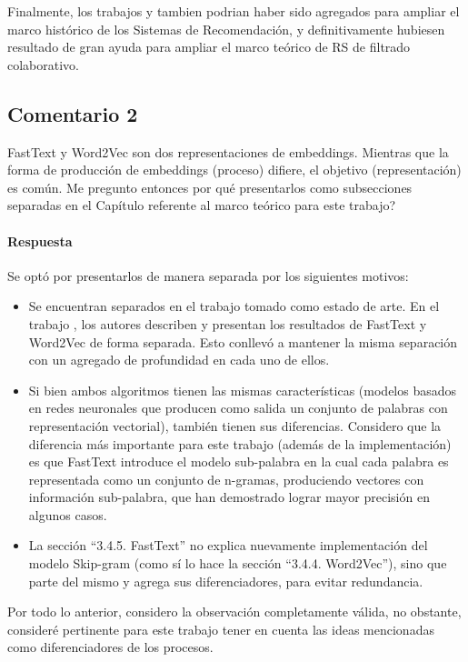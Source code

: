 \bigskip

Finalmente, los trabajos \citep{hill1995recommending} y \citep{resnick1994grouplens} tambien podrian haber sido agregados para ampliar el marco histórico de los Sistemas de Recomendación, y definitivamente hubiesen resultado de gran ayuda para ampliar el marco teórico de RS de filtrado colaborativo.

\subsection*{Comentario 2}
FastText y Word2Vec son dos representaciones de embeddings. Mientras que la forma de producción de embeddings (proceso) difiere, el objetivo (representación) es común. Me pregunto entonces por qué presentarlos como subsecciones separadas en el Capítulo referente al marco teórico para este trabajo?

\paragraph*{Respuesta}
Se optó por presentarlos de manera separada por los siguientes motivos:
\begin{itemize}
	\item Se encuentran separados en el trabajo tomado como estado de arte. En el trabajo \citep{gonzalez2017comparative}, los autores describen y presentan los resultados de FastText y Word2Vec de forma separada. Esto conllevó a mantener la misma separación con un agregado de profundidad en cada uno de ellos.
	\item Si bien ambos algoritmos tienen las mismas características (modelos basados en redes neuronales que producen como salida un conjunto de palabras con representación vectorial), también tienen sus diferencias. Considero que la diferencia más importante para este trabajo (además de la implementación) es que FastText introduce el modelo sub-palabra en la cual cada palabra es representada como un conjunto de n-gramas, produciendo vectores con información sub-palabra, que han demostrado lograr mayor precisión en algunos casos.
	\item La sección ``3.4.5. FastText'' no explica nuevamente implementación del modelo Skip-gram (como sí lo hace la sección ``3.4.4. Word2Vec''), sino que parte del mismo y agrega sus diferenciadores, para evitar redundancia.
\end{itemize}

Por todo lo anterior, considero la observación completamente válida, no obstante, consideré pertinente para este trabajo tener en cuenta las ideas mencionadas como diferenciadores de los procesos.

